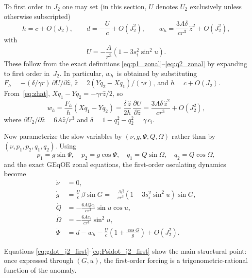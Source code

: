 \documentclass[11pt]{article}
\begin{document}
To first order in $J_2$ one may set (in this section, $U$ denotes $U_2$
exclusively unless otherwise subscripted)
\begin{equation}
h = c + O(J_2),
\qquad
d = -\frac{U}{c} + O(J_2^2),
\qquad
w_h = \frac{3A\delta}{c r^3}\,\hat z^2 + O(J_2^2),
\label{eq:wh_j2_first}
\end{equation}
with
\begin{equation}
U = -\frac{A}{r^3}\left(1-3s_i^2\sin^2 u\right).
\end{equation}
These follow from the exact definitions \eqref{eq:p1_zonal}--\eqref{eq:q2_zonal}
by expanding to first order in~$J_2$. In particular, $w_h$~is obtained by
substituting $F_h = -(\delta/\gamma r)\,\partial U/\partial\hat z$,
$\hat z = 2(Yq_2-Xq_1)/(\gamma r)$, and $h = c + O(J_2)$.
From~\eqref{eq:zhat}, $Xq_1 - Yq_2 = -\gamma r\hat z/2$, so
\begin{equation}
w_h
= \frac{F_h}{h}(Xq_1 - Yq_2)
= \frac{\delta\,\hat z}{2h}\,\frac{\partial U}{\partial\hat z}
= \frac{3A\delta\,\hat z^2}{c r^3} + O(J_2^2),
\end{equation}
where $\partial U_2/\partial\hat z = 6A\hat z/r^3$ and
$\delta = 1-q_1^2-q_2^2 = \gamma\,c_i$.

Now parameterize the slow variables by $(\nu,g,\Psi,Q,\Omega)$ rather than by
$(\nu,p_1,p_2,q_1,q_2)$. Using
\begin{equation}
p_1 = g\sin\Psi,
\quad
p_2 = g\cos\Psi,
\quad
q_1 = Q\sin\Omega,
\quad
q_2 = Q\cos\Omega,
\end{equation}
and the exact GEqOE zonal equations, the first-order osculating dynamics become
\begin{align}
\dot \nu &= 0, \\
\dot g &=
\frac{U}{c}\,\beta \sin G
= -\frac{A\beta}{c r^3}
\left(1-3s_i^2\sin^2 u\right)\sin G,
\label{eq:gdot_j2_first}\\
\dot Q &=
-\frac{6A Q c_i}{c r^3}\sin u \cos u,
\label{eq:Qdot_j2_first}\\
\dot\Omega &=
-\frac{6A c_i}{c r^3}\sin^2 u,
\label{eq:Omegadot_j2_first}\\
\dot\Psi &=
d - w_h - \frac{U}{c}\left(1 + \frac{\cos G}{g}\right)
+ O(J_2^2).
\label{eq:Psidot_j2_first}
\end{align}

Equations \eqref{eq:gdot_j2_first}-\eqref{eq:Psidot_j2_first} show the
main structural point: once expressed through $(G,u)$, the first-order forcing
is a trigonometric-rational function of the anomaly.
\end{document}
